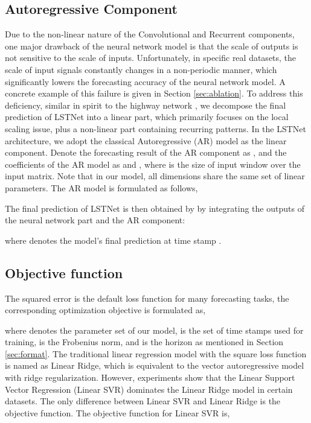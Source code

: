 \documentclass[sigconf]{acmart}
\begin{document}
\subsection{Autoregressive Component}
\label{sec:AR}
Due to the non-linear nature of the Convolutional and Recurrent components, one major drawback of the neural network model is that the scale of outputs is not sensitive to the scale of inputs. Unfortunately, in specific real datasets, the scale of input signals constantly changes in a non-periodic manner, which significantly lowers the forecasting accuracy of the neural network model. A concrete example of this failure is given in Section \ref{sec:ablation}. To address this deficiency, similar in spirit to the highway network \cite{srivastava2015highway}, we decompose the final prediction of LSTNet into a linear part, which primarily focuses on the local scaling issue, plus a non-linear part containing recurring patterns. In the LSTNet architecture, we adopt the classical Autoregressive (AR) model as the linear component. Denote the forecasting result of the AR component as , and the coefficients of the AR model as  and , where  is the size of input window over the input matrix. Note that in our model, all dimensions share the same set of linear parameters. The AR model is formulated as follows,


The final prediction of LSTNet is then obtained by by integrating the outputs of the neural network part and the AR component:

where  denotes the model's final prediction at time stamp .

\subsection{Objective function}
The squared error is the default loss function for many forecasting tasks,
the corresponding optimization objective is formulated as,

where  denotes the parameter set of our model,  is the set of time stamps used for training,  is the Frobenius norm, and  is the horizon as mentioned in Section \ref{sec:format}.
The traditional linear regression model with the square loss function is named as Linear Ridge, which is equivalent to the vector autoregressive model with ridge regularization. However, experiments show that the Linear Support Vector Regression (Linear SVR) \cite{vapnik1997support} dominates the Linear Ridge model in certain datasets. The only difference between Linear SVR and Linear Ridge is the objective function. The objective function for Linear SVR is,
\end{document}
